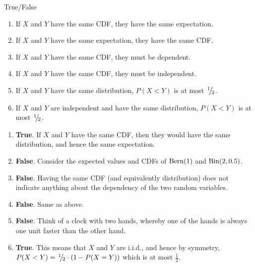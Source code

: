 \documentclass[11pt]{article}
\begin{document}
\begin{exercise}{True/False}
\begin{enumerate}
\vspace{-5mm}
\item If $X$ and $Y$ have the same CDF, they have the same expectation.
\item If $X$ and $Y$ have the same expectation, they have the same CDF.
\item If $X$ and $Y$ have the same CDF, they must be dependent.
\item If $X$ and $Y$ have the same CDF, they must be independent.
\item If $X$ and $Y$ have the same distribution, $P(X < Y)$ is at most $\slfrac{1}{2}$.
\item If $X$ and $Y$ are independent and have the same distribution, $P(X < Y)$ is at most $\slfrac{1}{2}$.
\end{enumerate}
\end{exercise}

\begin{solution}{3}
\vspace{-5mm}
\begin{enumerate}
\item \textbf{True}. If $X$ and $Y$ have the same CDF, then they would have the same distribution, and hence the same expectation.
\item \textbf{False}. Consider the expected values and CDFs of $\textrm{Bern}(1)$ and $\textrm{Bin}(2, 0.5)$.
\item \textbf{False}. Having the same CDF (and equivalently distribution) does not indicate anything about the dependency of the two random variables.
\item \textbf{False}. Same as above.
\item \textbf{False}. Think of a clock with two hands, whereby one of the hands is always one unit faster than the other hand.
\item \textbf{True}. This means that $X$ and $Y$ are i.i.d., and hence by symmetry, $P(X < Y) =  \slfrac{1}{2} \cdot (1 - P(X = Y))$ which is at most $\frac{1}{2}$. 
\end{enumerate}
\end{solution}
\end{document}
